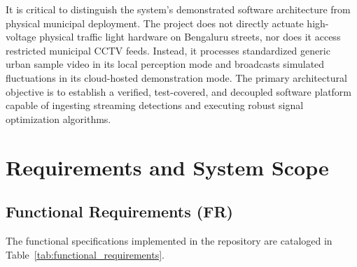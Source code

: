 \documentclass[11pt,a4paper,oneside]{report}
\begin{document}
\begin{conceptbox}
It is critical to distinguish the system's demonstrated software architecture from physical municipal deployment. The project does not directly actuate high-voltage physical traffic light hardware on Bengaluru streets, nor does it access restricted municipal CCTV feeds. Instead, it processes standardized generic urban sample video in its local perception mode and broadcasts simulated fluctuations in its cloud-hosted demonstration mode. The primary architectural objective is to establish a verified, test-covered, and decoupled software platform capable of ingesting streaming detections and executing robust signal optimization algorithms.
\end{conceptbox}



\chapter{Requirements and System Scope}

\section{Functional Requirements (FR)}
The functional specifications implemented in the repository are cataloged in Table~\ref{tab:functional_requirements}.
\end{document}
